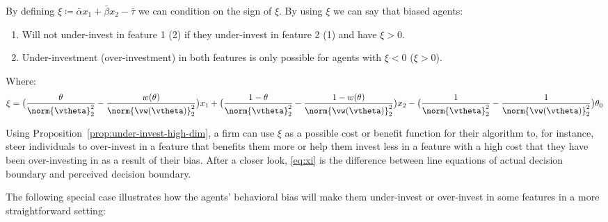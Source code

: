 By defining $\xi \coloneqq \bar\alpha x_1 + \bar\beta x_2 - \bar\tau$ we can condition on the sign of $\xi$. By using $\xi$ we can say that biased agents:
\begin{enumerate}
    \item Will not under-invest in feature 1 (2) if they under-invest in feature 2 (1) and have $\xi > 0$.
    \item Under-investment (over-investment) in both features is only possible for agents with $\xi < 0$ ($\xi > 0$).
\end{enumerate}
Where:
\begin{align}\label{eq:xi}
    \xi = \big( \frac{\theta}{\norm{\vtheta}_2^2} - \frac{w(\theta)}{\norm{\vw(\vtheta)}_2^2} \big) x_1 + \big( \frac{1-\theta}{\norm{\vtheta}_2^2} - \frac{1-w(\theta)}{\norm{\vw(\vtheta)}_2^2} \big) x_2 - \big( \frac{1}{\norm{\vtheta}_2^2} - \frac{1}{\norm{\vw(\vtheta)}_2^2} \big) \theta_0
\end{align}

Using Proposition~\ref{prop:under-invest-high-dim}, a firm can use $\xi$ as a possible cost or benefit function for their algorithm to, for instance, steer individuals to over-invest in a feature that benefits them more or help them invest less in a feature with a high cost that they have been over-investing in as a result of their bias. After a closer look, \eqref{eq:xi} is the difference between line equations of actual decision boundary and perceived decision boundary.

The following special case illustrates how the agents' behavioral bias will make them under-invest or over-invest in some features in a more straightforward setting:

